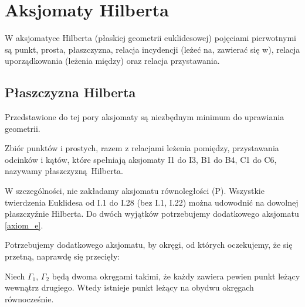 %

\section{Aksjomaty Hilberta}
W aksjomatyce Hilberta (płaskiej geometrii euklidesowej) pojęciami pierwotnymi są punkt, prosta, płaszczyzna, relacja incydencji (leżeć na, zawierać się w), relacja uporządkowania (leżenia między) oraz relacja przystawania.

%

%

%

%

%


%

\subsection{Płaszczyzna Hilberta}

Przedstawione do tej pory aksjomaty są niezbędnym minimum do uprawiania geometrii.

\begin{definition}
    Zbiór punktów i prostych, razem z relacjami leżenia pomiędzy, przystawania odcinków i kątów, które spełniają aksjomaty I1 do I3, B1 do B4, C1 do C6, nazywamy płaszczyzną Hilberta.
\end{definition}

W szczególności, nie zakładamy aksjomatu równoległości (P).
Wszystkie twierdzenia Euklidesa od I.1 do I.28 (bez I.1, I.22) można udowodnić na dowolnej płaszczyźnie Hilberta.
Do dwóch wyjątków potrzebujemy dodatkowego aksjomatu \ref{axiom_e}.
%

Potrzebujemy dodatkowego aksjomatu, by okręgi, od których oczekujemy, że się przetną, naprawdę się przecięły:

\begin{axiom}
    \label{axiom_e}
    Niech $\Gamma_1$, $\Gamma_2$ będą dwoma okręgami takimi, że każdy zawiera pewien punkt leżący wewnątrz drugiego.
    Wtedy istnieje punkt leżący na obydwu okręgach równocześnie.
\end{axiom}

